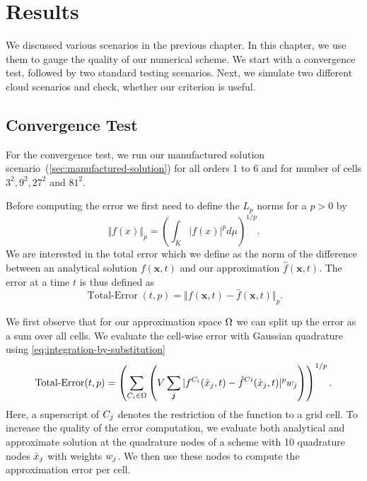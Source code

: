 \chapter{Results}\label{chap:results}
We discussed various scenarios in the previous chapter.
In this chapter, we use them to gauge the quality of our numerical scheme.
We start with a convergence test, followed by two standard testing scenarios.
Next, we simulate two different cloud scenarios and check, whether our \amr{} criterion is useful.

\newcommand{\error}{\operatorname{Total-Error}}
\section{Convergence Test}\label{sec:results-convergence}
For the convergence test, we run our manufactured solution scenario~(\cref{sec:manufactured-solution}) for all orders 1 to 6 and for number of cells $3^2, 9^2, 27^2$ and $81^2 $.

Before computing the error we first need to define the $L_p$ norms for a $p > 0$ by
\begin{equation}
  \label{eq:Lp-nrom}
  \Vert f(x) \Vert_p = \left( \int_K \vert f(x) \vert^p d\mu  \right)^{1/p}.
\end{equation}
We are interested in the total error which we define as the norm of the difference between an analytical solution $f(\bm{x}, t)$ and our approximation $\hat{f}(\bm{x}, t)$.
The error at a time $t$ is thus defined as
\begin{equation}
  \label{eq:error}
  \error(t,p) = \Vert f(\bm{x}, t) - \hat{f}(\bm{x}, t) \Vert_p.
\end{equation}

We first observe that for our approximation space $\broken$ we can split up the error as a sum over all cells.
We evaluate the cell-wise error with Gaussian quadrature using \cref{eq:integration-by-substitution}
 \begin{equation}
   \error(t,p) = 
   \left( \sum_{\cell[i] \in \broken}
    \left( V \sum_{\bm{j}} \vert f^{\cell[i]}(\quadNode[j], t) - \hat{f}^{\cell{i}}(\quadNode[j], t) \vert^p \quadWeight[j] \right) \right)^{1/p}.
 \end{equation}
Here, a superscript of $\cell[j]$ denotes the restriction of the function to a grid cell.
To increase the quality of the error computation, we evaluate both analytical and approximate solution at the quadrature nodes of a scheme with 10 quadrature nodes $\quadNode[j]$ with weights $\quadWeight[j]$.
We then use these nodes to compute the approximation error per cell.

